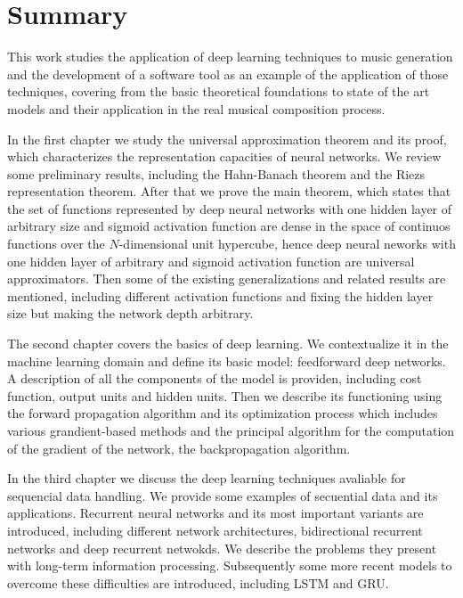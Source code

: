 %

\chapter{Summary}

This work studies the application of deep learning techniques to music generation and the development of a software tool as an example of the application of those techniques, covering from the basic theoretical foundations to state of the art models and their application in the real musical composition process.

In the first chapter we study the universal approximation theorem and its proof, which
characterizes the representation capacities of neural networks. We review some preliminary results, including the Hahn-Banach theorem and the Riezs representation theorem. After that we prove the main theorem, which states that the set of functions represented by deep neural networks with one hidden layer of arbitrary size and sigmoid activation function are dense in the space of continuos functions over the $N$-dimensional unit hypercube, hence deep neural neworks with one hidden layer of arbitrary and sigmoid activation function are universal approximators. Then some of the existing generalizations and related results are mentioned, including different activation functions and fixing the hidden layer size but making the network depth arbitrary.

The second chapter covers the basics of deep learning. We contextualize it in the machine learning domain and define its basic model: feedforward deep networks. A description of all the components of the model is providen, including cost function, output units and hidden units. Then we describe its functioning using the forward propagation algorithm and its optimization process which includes various grandient-based methods and the principal algorithm for the computation of the gradient of the network, the backpropagation algorithm.

In the third chapter we discuss the deep learning techniques avaliable for sequencial data handling. We provide some examples of secuential data and its applications. Recurrent neural networks and its most important variants are introduced, including different network architectures, bidirectional recurrent networks and deep recurrent netwokds. We describe the problems they present with long-term information processing. Subsequently some more recent models to overcome these difficulties are introduced, including LSTM and GRU.

